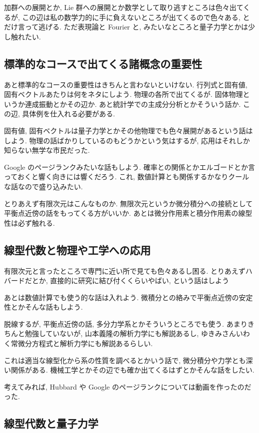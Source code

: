 \documentclass[openany, a4paper, oneside]{jsbook}
\begin{document}
加群への展開とか, Lie 群への展開とか数学として取り逃すところは色々出てくるが,
この辺は私の数学力的に手に負えないところが出てくるので色々ある, とだけ言って逃げる.
ただ表現論と Fourier と, みたいなところと量子力学とかは少し触れたい.
\subsection{標準的なコースで出てくる諸概念の重要性}

あと標準的なコースの重要性はきちんと言わないといけない.
行列式と固有値, 固有ベクトルあたりは何をネタにしよう.
物理の各所で出てくるが. 固体物理というか連成振動とかその辺か.
あと統計学での主成分分析とかそういう話か.
この辺, 具体例を仕入れる必要がある.

固有値, 固有ベクトルは量子力学とかその他物理でも色々展開があるという話はしよう.
物理の話ばかりしているのもどうかという気はするが, 応用はそれしか知らない無学な市民だった.

Google のページランクみたいな話もしよう.
確率との関係とかエルゴードとか言っておくと響く向きには響くだろう.
これ, 数値計算とも関係するかなりクールな話なので盛り込みたい.

とりあえず有限次元はこんなものか.
無限次元というか微分積分への接続として平衡点近傍の話をもってくる方がいいか.
あとは微分作用素と積分作用素の線型性は必ず触れる.
\subsection{線型代数と物理や工学への応用}

有限次元と言ったところで専門に近い所で見ても色々あるし困る.
とりあえずハバードだとか, 直接的に研究に結び付くくらいやばい, という話はしよう

あとは数値計算でも使う的な話は入れよう.
微積分との絡みで平衡点近傍の安定性とかそんな話もしよう.

脱線するが, 平衡点近傍の話, 多分力学系とかそういうところでも使う.
あまりきちんと勉強していないが, 山本義隆の解析力学にも解説あるし,
ゆきみさんいわく常微分方程式と解析力学にも解説あるらしい.

これは適当な線型化から系の性質を調べるとかいう話で, 微分積分や力学とも深い関係がある.
機械工学とかその辺でも確か出てくるはずとかそんな話をしたい.

考えてみれば, Hubbard や Google のページランクについては動画を作ったのだった.
\subsection{線型代数と量子力学}
\end{document}
